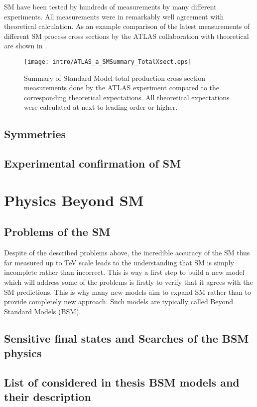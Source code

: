 SM have been tested by hundreds of measurements by many different experiments.
All measurements were in remarkably well agreement with theoretical calculation.
As an example comparison of the latest measurements of different SM process cross sections by the ATLAS collaboration with theoretical are shown in
.

\begin{figure}[]
  \centering
  \texttt{[image: intro/ATLAS\_a\_SMSummary\_TotalXsect.eps]}
  \caption{
  Summary of Standard Model total production cross section measurements done by the ATLAS experiment compared to the corresponding theoretical expectations. 
  All theoretical expectations were calculated at next-to-leading order or higher. 
  }
  \label{fig:SM_theory_vs_data}
\end{figure}



\subsection{Symmetries}

\subsection{Experimental confirmation of SM}

\section{Physics Beyond SM}

\subsection{Problems of the SM}

Despite of the described problems above, the incredible accuracy of the SM thus far measured up to TeV scale leads to the understanding that SM 
is simply incomplete rather than incorrect. 
This is way a first step to build a new model which will address some of the problems is firstly to verify that it agrees with the SM predictions. 
This is why many new models aim to expand SM rather than to provide completely new approach.
Such models are typically called Beyond Standard Models (BSM).

\subsection{Sensitive final states and Searches of the BSM physics}

\subsection{List of considered in thesis BSM models and their description}

